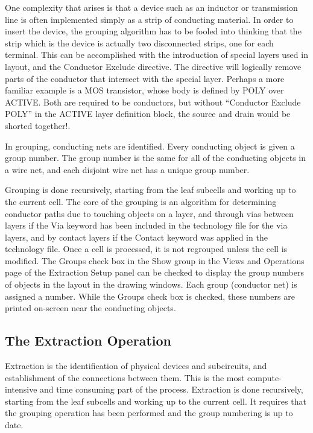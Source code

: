 One complexity that arises is that a device such as an inductor or
transmission line is often implemented simply as a strip of conducting
material.  In order to insert the device, the grouping algorithm has
to be fooled into thinking that the strip which is the device is
actually two disconnected strips, one for each terminal.  This can be
accomplished with the introduction of special layers used in layout,
and the {\vt Conductor Exclude} directive.  The directive will
logically remove parts of the conductor that intersect with the
special layer.  Perhaps a more familiar example is a MOS transistor,
whose body is defined by POLY over ACTIVE.  Both are required to be
conductors, but without ``{\vt Conductor Exclude POLY}'' in the ACTIVE
layer definition block, the source and drain would be shorted
together!.

In grouping, conducting nets are identified.  Every conducting object
is given a group number.  The group number is the same for all of the
conducting objects in a wire net, and each disjoint wire net has a
unique group number.

Grouping is done recursively, starting from the leaf subcells and
working up to the current cell.  The core of the grouping is an
algorithm for determining conductor paths due to touching objects on a
layer, and through vias between layers if the {\vt Via} keyword has
been included in the technology file for the via layers, and by
contact layers if the {\vt Contact} keyword was applied in the
technology file.  Once a cell is processed, it is not regrouped unless
the cell is modified.  The {\cb Groups} check box in the {\cb Show}
group in the {\cb Views and Operations} page of the {\cb Extraction
Setup} panel can be checked to display the group numbers of objects in
the layout in the drawing windows.  Each group (conductor net) is
assigned a number.  While the {\cb Groups} check box is checked, these
numbers are printed on-screen near the conducting objects.

\subsection{The Extraction Operation}

Extraction is the identification of physical devices and subcircuits,
and establishment of the connections between them.  This is the most
compute-intensive and time consuming part of the process.  Extraction
is done recursively, starting from the leaf subcells and working up to
the current cell.  It requires that the grouping operation has been
performed and the group numbering is up to date.

